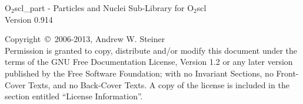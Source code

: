 \documentclass{article}
\begin{document}
\hypersetup{pageanchor=false,citecolor=blue}

\begin{titlepage}
\vspace*{7cm}
\begin{center}
{\huge O$_2$scl\_part - Particles and Nuclei Sub-Library for O$_2$scl
\\[1ex]\large Version 0.914}\\
\end{center}
\vfill
Copyright~{\copyright}~2006-2013,
Andrew W. Steiner \\
Permission is granted to copy, distribute and/or modify this document
under the terms of the GNU Free Documentation License, Version 1.2 or
any later version published by the Free Software Foundation; with no
Invariant Sections, no Front-Cover Texts, and no Back-Cover Texts.  A
copy of the license is included in the section entitled ``License
Information''.
\end{titlepage}

\tableofcontents
{}
\hypersetup{pageanchor=true,citecolor=blue}
\end{document}
